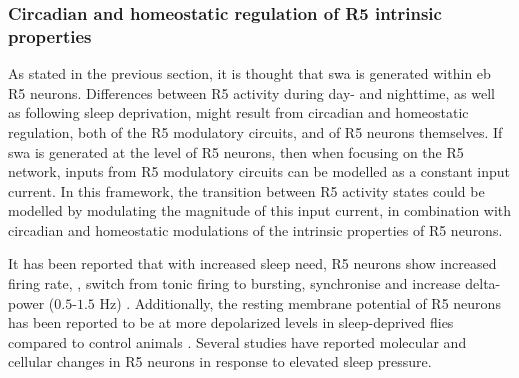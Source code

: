 \documentclass[../main.tex]{subfiles}
\begin{document}
\subsubsection{Circadian and homeostatic regulation of R5 intrinsic properties} \label{subsubsec:circ_and_hemeo_r5}

As stated in the previous section, it is thought that \gls{swa} is generated within \gls{eb} R5 neurons.
Differences between R5 activity during day- and nighttime, as well as following sleep deprivation, might result from circadian and homeostatic regulation, both of the R5 modulatory circuits, and of R5 neurons themselves. If \gls{swa} is generated at the level of R5 neurons, then when focusing on the R5 network, inputs from R5 modulatory circuits can be modelled as a constant input current. In this framework, the transition between R5 activity states could be modelled by modulating the magnitude of this input current, in combination with circadian and homeostatic modulations of the intrinsic properties of R5 neurons.

It has been reported that with increased sleep need, R5 neurons show increased firing rate, \parencite{raccugliaNetworkSpecificSynchronizationElectrical2019,liuSleepDriveEncoded2016},
switch from tonic firing to bursting, synchronise and increase delta-power ($0.5$-$1.5$ Hz) \parencite{raccugliaNetworkSpecificSynchronizationElectrical2019}. Additionally, the resting membrane potential of R5 neurons has been reported to be at more depolarized levels in sleep-deprived flies compared to control animals \parencite{liuSleepDriveEncoded2016}. Several studies have reported molecular and cellular changes in R5 neurons in response to elevated sleep pressure.
\end{document}

